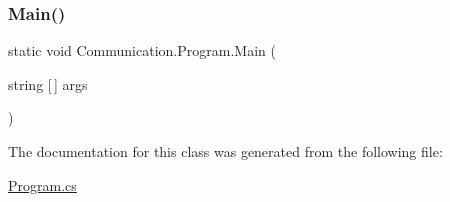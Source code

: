 \subsubsection{\texorpdfstring{Main()}{Main()}}
{\footnotesize\ttfamily static void Communication.\+Program.\+Main (\begin{DoxyParamCaption}\item[{string \mbox{[}$\,$\mbox{]}}]{args }\end{DoxyParamCaption})\hspace{0.3cm}{\ttfamily [static]}}



The documentation for this class was generated from the following file\+:\begin{DoxyCompactItemize}
\item 
\mbox{\hyperlink{_program_8cs}{Program.\+cs}}\end{DoxyCompactItemize}
